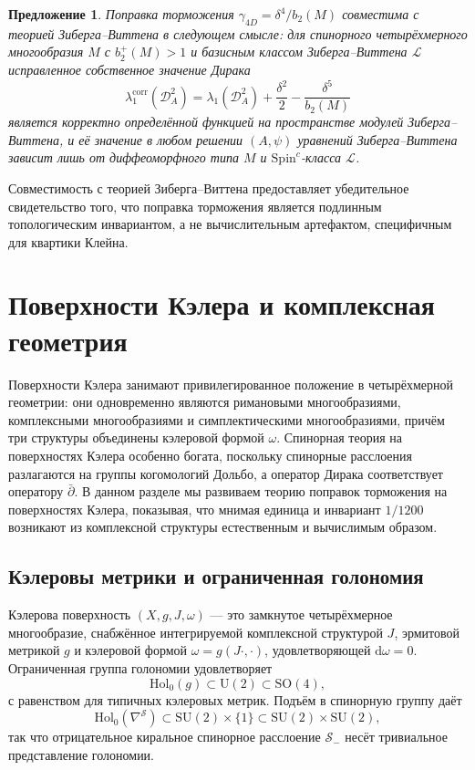 \documentclass[12pt,a4paper]{article}
\newtheorem{proposition}[theorem]{Предложение}
\theoremstyle{definition}
\theoremstyle{remark}
\newcommand{\SO}{\mathrm{SO}}
\newcommand{\cD}{\mathcal{D}}
\newcommand{\cL}{\mathcal{L}}
\newcommand{\cS}{\mathcal{S}}
\newcommand{\dd}{\mathrm{d}}
\newcommand{\SU}{\mathrm{SU}}
\newcommand{\U}{\mathrm{U}}
\newcommand{\Hol}{\mathrm{Hol}}
\newcommand{\Spinc}{\mathrm{Spin}^c}
\begin{document}
\begin{proposition}
Поправка торможения $\gamma_{4D} = \delta^4/b_2(M)$ совместима с теорией Зиберга--Виттена в следующем смысле: для спинорного четырёхмерного многообразия $M$ с $b_2^+(M) > 1$ и базисным классом Зиберга--Виттена $\cL$ исправленное собственное значение Дирака
\begin{equation}
\lambda_1^{\mathrm{corr}}(\cD_A^2) = \lambda_1(\cD_A^2) + \frac{\delta^2}{2} - \frac{\delta^5}{b_2(M)}
\end{equation}
является корректно определённой функцией на пространстве модулей Зиберга--Виттена, и её значение в любом решении $(A, \psi)$ уравнений Зиберга--Виттена зависит лишь от диффеоморфного типа $M$ и $\Spinc$-класса $\cL$.
\end{proposition}

Совместимость с теорией Зиберга--Виттена предоставляет убедительное свидетельство того, что поправка торможения является подлинным топологическим инвариантом, а не вычислительным артефактом, специфичным для квартики Клейна.

\section{Поверхности Кэлера и комплексная геометрия}
\label{sec:kahler-ru}

Поверхности Кэлера занимают привилегированное положение в четырёхмерной геометрии: они одновременно являются римановыми многообразиями, комплексными многообразиями и симплектическими многообразиями, причём три структуры объединены кэлеровой формой $\omega$. Спинорная теория на поверхностях Кэлера особенно богата, поскольку спинорные расслоения разлагаются на группы когомологий Дольбо, а оператор Дирака соответствует оператору $\bar\partial$. В данном разделе мы развиваем теорию поправок торможения на поверхностях Кэлера, показывая, что мнимая единица и инвариант $1/1200$ возникают из комплексной структуры естественным и вычислимым образом.

\subsection{Кэлеровы метрики и ограниченная голономия}

Кэлерова поверхность $(X, g, J, \omega)$ --- это замкнутое четырёхмерное многообразие, снабжённое интегрируемой комплексной структурой $J$, эрмитовой метрикой $g$ и кэлеровой формой $\omega = g(J\cdot, \cdot)$, удовлетворяющей $\dd\omega = 0$. Ограниченная группа голономии удовлетворяет
\begin{equation}
\Hol_0(g) \subset \U(2) \subset \SO(4),
\end{equation}
с равенством для типичных кэлеровых метрик. Подъём в спинорную группу даёт
\begin{equation}
\Hol_0(\nabla^{\cS}) \subset \SU(2) \times \{1\} \subset \SU(2) \times \SU(2),
\end{equation}
так что отрицательное киральное спинорное расслоение $\cS_-$ несёт тривиальное представление голономии.
\end{document}
